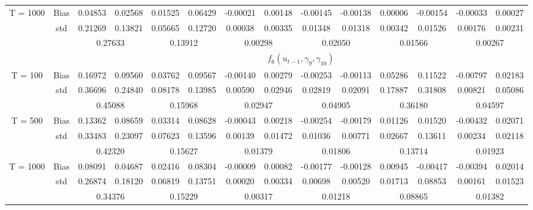 \documentclass[a4paper,12pt,times,numbered,print,index]{report}
\numberwithin{equation}{section}
\begin{document}
\begin{table}[htbp]
\begin{adjustbox}{max width=\textwidth}
\begin{tabular}{cccccccccccccc}
		\multirow{3}[1]{*}{T = 1000} & Bias  & \textcolor[rgb]{ .184,  .459,  .71}{0.04853} & 0.02568 & 0.01525 & 0.06429 & -0.00021 & 0.00148 & \textcolor[rgb]{ .184,  .459,  .71}{-0.00145} & -0.00138 & 0.00006 & -0.00154 & -0.00033 & 0.00027 \\
		& std   & 0.21269 & 0.13821 & 0.05665 & 0.12720 & 0.00038 & 0.00335 & 0.01348 & 0.01318 & 0.00342 & 0.01526 & 0.00176 & 0.00231 \\
		&       & \multicolumn{2}{c}{0.27633} & \multicolumn{2}{c}{0.13912} & \multicolumn{2}{c}{0.00298} & \multicolumn{2}{c}{0.02050} & \multicolumn{2}{c}{0.01566} & \multicolumn{2}{c}{0.00267} \\
		\midrule
		&       & \multicolumn{12}{c}{$f_6 (u_{t-1}, \gamma_9, \gamma_{10})$} \\
		\midrule
		T = 100 & Bias  & 0.16972 & 0.09560 & 0.03762 & 0.09567 & -0.00140 & 0.00279 & -0.00253 & -0.00113 & 0.05286 & 0.11522 & -0.00797 & 0.02183 \\
		& std   & 0.36696 & 0.24840 & 0.08178 & 0.13985 & 0.00590 & 0.02946 & 0.02819 & 0.02091 & 0.17887 & 0.31808 & 0.00821 & 0.05086 \\
		&       & \multicolumn{2}{c}{\textcolor[rgb]{ .329,  .51,  .208}{0.45088}} & \multicolumn{2}{c}{0.15968} & \multicolumn{2}{c}{0.02947} & \multicolumn{2}{c}{\textcolor[rgb]{ .329,  .51,  .208}{0.04905}} & \multicolumn{2}{c}{0.36180} & \multicolumn{2}{c}{0.04597} \\
		\multirow{3}[0]{*}{T = 500} & Bias  & 0.13362 & 0.08659 & 0.03314 & 0.08628 & -0.00043 & 0.00218 & -0.00254 & -0.00179 & 0.01126 & 0.01520 & -0.00432 & 0.02071 \\
		& std   & 0.33483 & 0.23097 & 0.07623 & 0.13596 & 0.00139 & 0.01472 & 0.01036 & 0.00771 & 0.02667 & 0.13611 & 0.00234 & 0.02118 \\
		&       & \multicolumn{2}{c}{\textcolor[rgb]{ .329,  .51,  .208}{0.42320}} & \multicolumn{2}{c}{0.15627} & \multicolumn{2}{c}{0.01379} & \multicolumn{2}{c}{\textcolor[rgb]{ .329,  .51,  .208}{0.01806}} & \multicolumn{2}{c}{0.13714} & \multicolumn{2}{c}{0.01923} \\
		\multirow{3}[1]{*}{T = 1000} & Bias  & 0.08091 & 0.04687 & 0.02416 & 0.08304 & -0.00009 & 0.00082 & -0.00177 & -0.00128 & 0.00945 & -0.00417 & -0.00394 & 0.02014 \\
		& std   & 0.26874 & 0.18120 & 0.06819 & 0.13751 & 0.00020 & 0.00334 & 0.00698 & 0.00520 & 0.01713 & 0.08853 & 0.00161 & 0.01523 \\
		&       & \multicolumn{2}{c}{\textcolor[rgb]{ .329,  .51,  .208}{0.34376}} & \multicolumn{2}{c}{0.15229} & \multicolumn{2}{c}{0.00317} & \multicolumn{2}{c}{\textcolor[rgb]{ .329,  .51,  .208}{0.01218}} & \multicolumn{2}{c}{0.08865} & \multicolumn{2}{c}{0.01382} \\
		\bottomrule
		\bottomrule
    	\end{tabular}%
		\end{adjustbox}
\label{nonco-f56}%
\end{table}%
\end{document}
